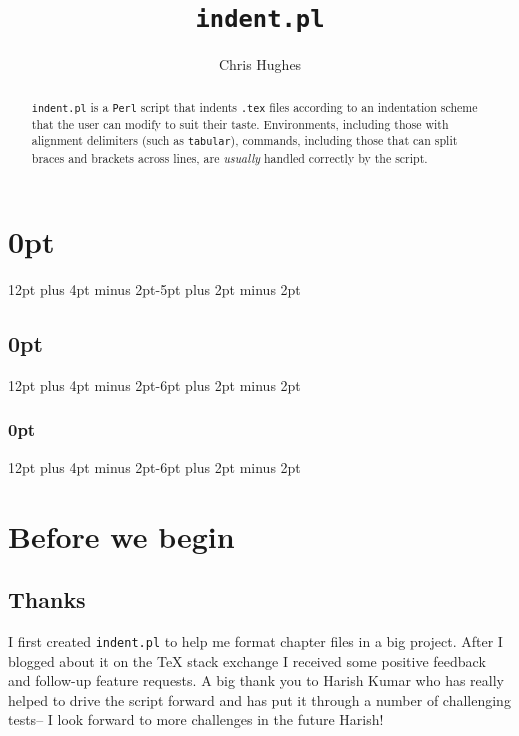 \titlespacing\section{0pt}{12pt plus 4pt minus 2pt}{-5pt plus 2pt minus 2pt}
\titlespacing\subsection{0pt}{12pt plus 4pt minus 2pt}{-6pt plus 2pt minus 2pt}
\titlespacing\subsubsection{0pt}{12pt plus 4pt minus 2pt}{-6pt plus 2pt minus 2pt}





\title{\lstinline[basicstyle=\huge\ttfamily]!indent.pl!}
\author{Chris Hughes}
\maketitle
\begin{abstract}
	\lstinline!indent.pl! is a \lstinline!Perl! script that indents \lstinline!.tex!
	files according to an indentation scheme that the user can modify to suit their 
	taste. Environments, including those with alignment delimiters (such as \lstinline!tabular!), 
	commands, including those that can split braces and brackets across lines, 
	are \emph{usually} handled correctly by the script.
\end{abstract}

\tableofcontents
\lstlistoflistings

\section{Before we begin}
 \subsection{Thanks}
 	I first created \lstinline!indent.pl! to help me format chapter files 
 	in a big project. After I blogged about it on the 
 	\TeX{} stack exchange \cite{cmhblog} I received some positive feedback and 
 	follow-up feature requests. A big thank you to Harish Kumar who has really 
 	helped to drive the script forward and has put it through a number of challenging
 	tests-- I look forward to more challenges in the future Harish!
 	 	
